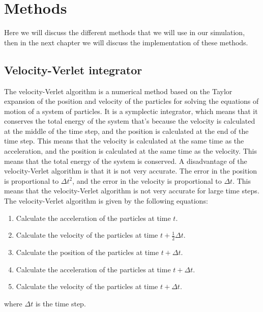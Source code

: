 \chapter{Methods}\label{chap:Methods}

    Here we will discuss the different methods that we will use in our simulation, then in the next chapter we will discuss the implementation of these methods.

\section{Velocity-Verlet integrator}
    The velocity-Verlet algorithm is a numerical method based on the Taylor expansion of the position and velocity of the particles for solving the equations of motion of a system of particles. It is a symplectic integrator, which means that it conserves the total energy of the system that's because the velocity is calculated at the middle of the time step, and the position is calculated at the end of the time step. This means that the velocity is calculated at the same time as the acceleration, and the position is calculated at the same time as the velocity. This means that the total energy of the system is conserved. A disadvantage of the velocity-Verlet algorithm is that it is not very accurate. The error in the position is proportional to $\Delta t^2$, and the error in the velocity is proportional to $\Delta t$. This means that the velocity-Verlet algorithm is not very accurate for large time steps. The velocity-Verlet algorithm is given by the following equations:
    \begin{enumerate}
        \item Calculate the acceleration of the particles at time $t$.
        \item Calculate the velocity of the particles at time $t+\frac{1}{2}\Delta t$.
        \item Calculate the position of the particles at time $t+\Delta t$.
        \item Calculate the acceleration of the particles at time $t+\Delta t$.
        \item Calculate the velocity of the particles at time $t+\Delta t$.
    \end{enumerate}
    where $\Delta t$ is the time step. 

